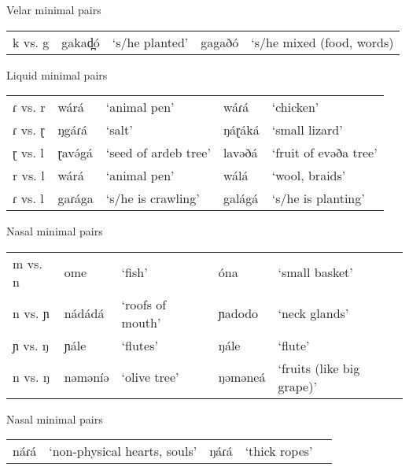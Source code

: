 \ea Velar minimal pairs
\begin{tabular}[t]{lllll}
k vs. g &	gakad̪ó	&‘s/he planted’	&gagaðó	&‘s/he mixed (food, words)
\end{tabular}\label{ex:ch2:45}
\z

			
\ea Liquid minimal pairs
\begin{tabular}[t]{lllll}
ɾ vs. r	&wárá	&‘animal pen’	&wáɾá	&‘chicken’\\
ɾ vs. ɽ	&ŋgáɾá	&‘salt’			&ŋáɽáká	&‘small lizard’\\
ɽ vs. l	&ɽavə́gá	&‘seed of ardeb tree’	&lavəðá	&‘fruit of evəða tree’\\
r vs. l	&wárá	&‘animal pen’	&wálá	&‘wool, braids’\\
ɾ vs. l	&gaɾága	&‘s/he is crawling’	&galágá	&‘s/he is planting’
\end{tabular}\label{ex:ch2:46}
\z 


\ea Nasal minimal pairs
\begin{tabular}[t]{lllll}
m vs. n	&ome	&‘fish’				&óna			&‘small basket’\\
n vs. ɲ	&nádádá	&‘roofs of mouth’	&ɲadodo		&‘neck glands’\\
ɲ vs. ŋ	&ɲále	&‘flutes’			&ŋále		&‘flute’\\
n vs. ŋ	&nəməníə	&‘olive tree’	&ŋəməneá	&‘fruits (like big grape)’
\end{tabular}\label{ex:ch2:47}
\z 

\ea Nasal minimal pairs
\begin{tabular}[t]{lllll}
	náɾá	& 	‘non-physical hearts, souls’	 	&	ŋáɾá	&	‘thick ropes’\\
\end{tabular}\label{ex:ch2:48}
\z 
